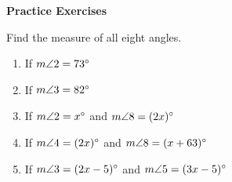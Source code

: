 \def\figdir{/storage/emulated/0/Documents/documents/latex/1920/Grade-8/3rd/properties-of-parallel-lines-cut-by-a-transversal/f}

\textbf{Practice Exercises}

\vspce

Find the measure of all eight angles. 
\begin{enumerate}[label = \arabic*. ]
\item \hspce If $m\angle{2} = 73 \degree $
\item \hspce If $m\angle{3} = 82 \degree $
\item \hspce If $m\angle{2} = x \degree $ and $m\angle{8} = (2x)  \degree $
\item \hspce If $m\angle{4} = (2x)\degree $ and $m\angle{8} = (x+63)  \degree $
\item \hspce If $m\angle{3} = (2x-5) \degree $ and $m\angle{5} = (3x-5)  \degree $
\hspace*{12ex}\vspace*{-12ex}
\vspace*{10ex}
\end{enumerate}  




